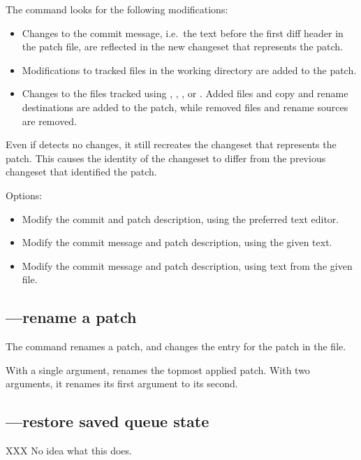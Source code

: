 The  command looks for the following modifications:
\begin{itemize}
\item Changes to the commit message, i.e.~the text before the first
  diff header in the patch file, are reflected in the new changeset
  that represents the patch.
\item Modifications to tracked files in the working directory are
  added to the patch.
\item Changes to the files tracked using , ,
  , or .  Added files and copy and rename
  destinations are added to the patch, while removed files and rename
  sources are removed.
\end{itemize}

Even if  detects no changes, it still recreates the
changeset that represents the patch.  This causes the identity of the
changeset to differ from the previous changeset that identified the
patch.

Options:
\begin{itemize}
\item[\hgxopt{mq}{qrefresh}{-e}] Modify the commit and patch description,
  using the preferred text editor.
\item[\hgxopt{mq}{qrefresh}{-m}] Modify the commit message and patch
  description, using the given text.
\item[\hgxopt{mq}{qrefresh}{-l}] Modify the commit message and patch
  description, using text from the given file.
\end{itemize}

\subsection{---rename a patch}

The  command renames a patch, and changes the entry for
the patch in the  file.

With a single argument,  renames the topmost applied
patch.  With two arguments, it renames its first argument to its
second.

\subsection{---restore saved queue state}

XXX No idea what this does.

